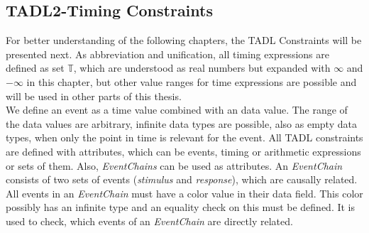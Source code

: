 \subsection{TADL2-Timing Constraints}
	For better understanding of the following chapters, the TADL Constraints will be presented next. As abbreviation and unification, all timing expressions are defined as set $\mathbb{T}$, which are understood as real numbers but expanded with $\infty$ and $-\infty$ in this chapter, but other value ranges for time expressions are possible and will be used in other parts of this thesis.\\
	We define an event as a time value combined with an data value. The range of the data values are arbitrary, infinite data types are possible, also as empty data types, when only the point in time is relevant for the event. All TADL constraints are defined with attributes, which can be events, timing or arithmetic expressions or sets of them. Also, \emph{EventChains} can be used as attributes. An \emph{EventChain} consists of two sets of events (\emph{stimulus} and \emph{response}),  which are causally related. All events in an \emph{EventChain} must have a color value in their data field. This color possibly has an infinite type and an equality check on this must be defined. It is used to check, which events of an \emph{EventChain} are directly related. 
